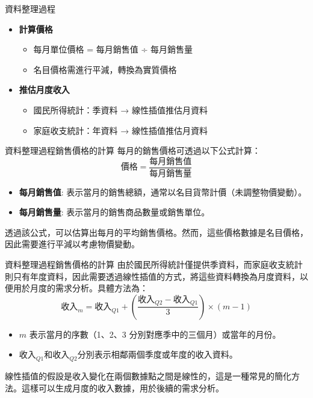 \documentclass[12pt]{beamer}
\begin{document}
\begin{frame}{資料整理過程}
	\begin{itemize}
		\item \textbf{計算價格}
		\begin{itemize}
			\vspace*{0.1cm}
			\item 每月單位價格 = 每月銷售值 ÷ 每月銷售量 \vspace*{0.1cm}
			\item 名目價格需進行平減，轉換為實質價格
		\end{itemize}
		\vspace*{0.3cm}

		\item \textbf{推估月度收入}
		\begin{itemize}
			\vspace*{0.1cm}
			\item 國民所得統計：季資料 → 線性插值推估月資料 \vspace*{0.1cm}
			\item 家庭收支統計：年資料 → 線性插值推估月資料
		\end{itemize}
	\end{itemize}
\end{frame}

\begin{frame}{資料整理過程}{銷售價格的計算}
	每月的銷售價格可透過以下公式計算：
	\[
		\text{價格} = \frac{\text{每月銷售值}}{\text{每月銷售量}}
	\]
	\begin{itemize}
		\item \textbf{每月銷售值}: 表示當月的銷售總額，通常以名目貨幣計價（未調整物價變動）。\vspace*{0.1cm}
		\item \textbf{每月銷售量}: 表示當月的銷售商品數量或銷售單位。
	\end{itemize} \vspace*{0.3cm}
	透過該公式，可以估算出每月的平均銷售價格。然而，這些價格數據是名目價格，因此需要進行平減以考慮物價變動。
\end{frame}

\begin{frame}{資料整理過程}{銷售價格的計算}
	由於國民所得統計僅提供季資料，而家庭收支統計則只有年度資料，因此需要透過線性插值的方式，將這些資料轉換為月度資料，以便用於月度的需求分析。具體方法為：
	\[
		\text{收入}_m = \text{收入}_{Q1} + \left( \frac{\text{收入}_{Q2} -\text{收入}_{Q1}}{3} \right) \times (m-1)
	\]
	\begin{itemize}
		\item $m$ 表示當月的序數（1、2、3 分別對應季中的三個月）或當年的月份。 \vspace*{0.1cm}
		\item $\text{收入}_{Q1}$和$\text{收入}_{Q2}$分別表示相鄰兩個季度或年度的收入資料。
	\end{itemize} \vspace*{0.3cm}
	線性插值的假設是收入變化在兩個數據點之間是線性的，這是一種常見的簡化方法。這樣可以生成月度的收入數據，用於後續的需求分析。
\end{frame}
\end{document}
